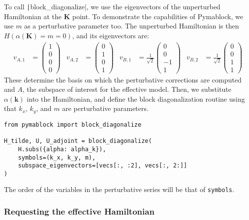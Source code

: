 To call \texttt|block_diagonalize|, we use the eigenvectors of the unperturbed
Hamiltonian at the $\mathbf{K}$ point.
To demonstrate the capabilities of Pymablock, we use $m$ as a perturbative
parameter too.
The unperturbed Hamiltonian is then $H(\alpha(\mathbf{K}) = m = 0)$, and its
eigenvectors are:
%
\begin{align}
v_{A,1} &= \begin{pmatrix} 1 \\ 0 \\ 0 \\ 0 \end{pmatrix} &
v_{A,2} &= \begin{pmatrix} 0 \\ 1 \\ 0 \\ 1 \end{pmatrix} &
v_{B,1} &= \frac{1}{\sqrt{2}} \begin{pmatrix} 0 \\ 0 \\ -1 \\ 1 \end{pmatrix} &
v_{B,2} &= \frac{1}{\sqrt{2}} \begin{pmatrix} 0 \\ 0 \\ 1 \\ 1 \end{pmatrix}
\end{align}
%
These determine the basis on which the perturbative corrections are computed
and $A$, the subspace of interest for the effective model.
Then, we substitute $\alpha(\mathbf{k})$ into the Hamiltonian, and define the
block diagonalization routine using that $k_x$, $k_y$, and $m$ are perturbative
parameters.
%
\begin{verbatim}
from pymablock import block_diagonalize

H_tilde, U, U_adjoint = block_diagonalize(
    H.subs({alpha: alpha_k}),
    symbols=(k_x, k_y, m),
    subspace_eigenvectors=[vecs[:, :2], vecs[:, 2:]]
)
\end{verbatim}
%
The order of the variables in the perturbative series will be that of \texttt{symbols}.

\subsubsection{Requesting the effective Hamiltonian}


